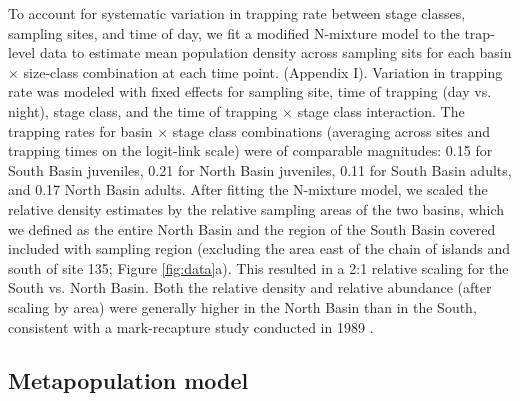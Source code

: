 \documentclass[11pt]{article}
\begin{document}
To account for systematic variation in trapping rate between stage classes,
sampling sites, and time of day,
we fit a modified N-mixture model \citep{royle2004}
to the trap-level data to estimate mean population density across sampling sits
for each basin $\times$ size-class combination at each time point.
(Appendix I).
Variation in trapping rate was modeled with fixed effects for
sampling site,
time of trapping (day vs. night),
stage class,
and the time of trapping $\times$ stage class interaction.
The trapping rates for basin $\times$ stage class combinations
(averaging across sites and trapping times on the logit-link scale)
were of comparable magnitudes:
0.15 for South Basin juveniles,
0.21 for North Basin juveniles,
0.11 for South Basin adults,
and 0.17 North Basin adults.
After fitting the N-mixture model,
we scaled the relative density estimates by the relative sampling areas of the two basins,
which we defined as the entire North Basin and the region of the South Basin
covered included with sampling region
(excluding the area east of the chain of islands and south of site 135;
Figure \ref{fig:data}a).
This resulted in a 2:1 relative scaling for the South vs. North Basin.
Both the relative density and relative abundance (after scaling by area)
were generally higher in the North Basin than in the South,
consistent with a mark-recapture study conducted in 1989 \citep{gislason1998}.





\subsection*{Metapopulation model}
\end{document}
